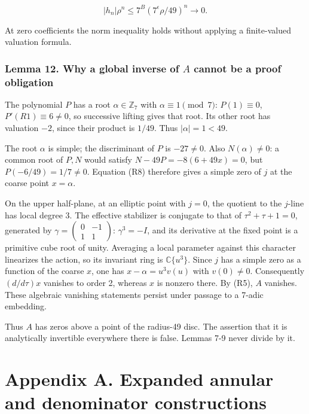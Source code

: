 \documentclass[11pt,a4paper]{article}
\begin{document}
\[
|h_n|\rho^n\le7^B(7^\epsilon\rho/49)^n\to0.
\]

At zero coefficients the norm inequality holds without applying a finite-valued valuation formula.

\hypertarget{lemma-12.-why-a-global-inverse-of-a-cannot-be-a-proof-obligation}{%
\subsubsection{\texorpdfstring{Lemma 12. Why a global inverse of \(A\) cannot be a proof obligation}{Lemma 12. Why a global inverse of A cannot be a proof obligation}}\label{lemma-12.-why-a-global-inverse-of-a-cannot-be-a-proof-obligation}}

The polynomial \(P\) has a root \(\alpha\in\mathbb Z_7\) with \(\alpha\equiv1\pmod7\): \(P(1)\equiv0\), \(P'(R1)\equiv6\ne0\), so successive lifting gives that root. Its other root has valuation \(-2\), since their product is \(1/49\). Thus \(|\alpha|=1<49\).

The root \(\alpha\) is simple; the discriminant of \(P\) is \(-27\ne0\). Also \(N(\alpha)\ne0\): a common root of \(P,N\) would satisfy \(N-49P=-8(6+49x)=0\), but \(P(-6/49)=1/7\ne0\). Equation (R8) therefore gives a simple zero of \(j\) at the coarse point \(x=\alpha\).

On the upper half-plane, at an elliptic point with \(j=0\), the quotient to the \(j\)-line has local degree 3. The effective stabilizer is conjugate to that of \(\tau^2+\tau+1=0\), generated by \(\gamma=\begin{pmatrix}0&-1\\1&1\end{pmatrix}\): \(\gamma^3=-I\), and its derivative at the fixed point is a primitive cube root of unity. Averaging a local parameter against this character linearizes the action, so its invariant ring is \(\mathbb C\{u^3\}\). Since \(j\) has a simple zero as a function of the coarse \(x\), one has \(x-\alpha=u^3v(u)\) with \(v(0)\ne0\). Consequently \((d/d\tau)x\) vanishes to order 2, whereas \(x\) is nonzero there. By (R5), \(A\) vanishes. These algebraic vanishing statements persist under passage to a 7-adic embedding.

Thus \(A\) has zeros above a point of the radius-49 disc. The assertion that it is analytically invertible everywhere there is false. Lemmas 7-9 never divide by it.

\clearpage

\hypertarget{appendix-a.-expanded-annular-and-denominator-constructions}{%
\section{Appendix A. Expanded annular and denominator constructions}\label{appendix-a.-expanded-annular-and-denominator-constructions}}
\end{document}
